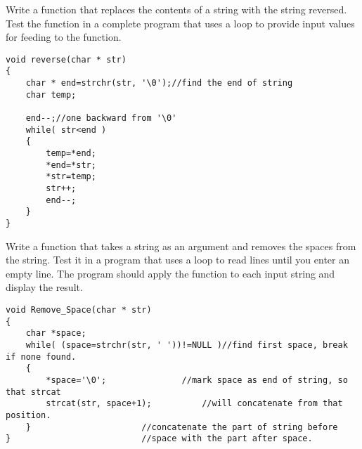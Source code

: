 \begin{question}
Write a function that replaces the contents of a string with the string reversed. Test the
function in a complete program that uses a loop to provide input values for feeding to
the function.
\end{question}
\begin{solution}
  \begin{verbatim}
void reverse(char * str)
{
	char * end=strchr(str, '\0');//find the end of string
	char temp;

	end--;//one backward from '\0'
	while( str<end )
	{
		temp=*end;
		*end=*str;
		*str=temp;
		str++;
		end--;
	}
}
  \end{verbatim}
\end{solution}

\begin{question}
 Write a function that takes a string as an argument and removes the spaces from the
 string. Test it in a program that uses a loop to read lines until you enter an empty line.
 The program should apply the function to each input string and display the result.
\end{question}
\begin{solution}
  \begin{verbatim}
void Remove_Space(char * str)
{
	char *space;
	while( (space=strchr(str, ' '))!=NULL )//find first space, break if none found.
	{
		*space='\0';		       //mark space as end of string, so that strcat 
		strcat(str, space+1);	       //will concatenate from that position.
	}				       //concatenate the part of string before 
}					       //space with the part after space.
  \end{verbatim}
\end{solution}

